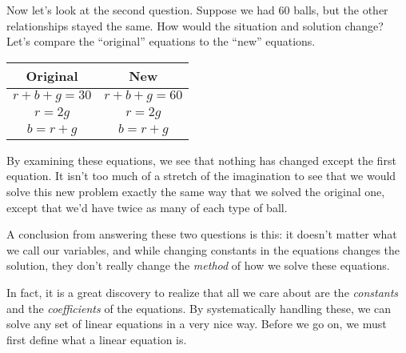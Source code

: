 Now let's look at the second question. Suppose we had 60 balls, but the other relationships stayed the same. How would the situation and solution change? Let's compare the ``original'' equations to the ``new'' equations.
\begin{center}\begin{tabular}{c|c} Original & New \\ \hline $r+b+g=30$ & $r+b+g=60$ \\ $r=2g$ & $r=2g$ \\ $b=r+g$ & $b=r+g$ \\ \end{tabular}\end{center}

By examining these equations, we see that nothing has changed except the first equation. It isn't too much of a stretch of the imagination to see that we would solve this new problem exactly the same way that we solved the original one, except that we'd have twice as many of each type of ball.



A conclusion from answering these two questions is this: it doesn't matter what we call our variables, and while changing constants in the equations changes the solution, they don't really change the {\em method} of how we solve these equations.

In fact, it is a great discovery to realize that all we care about are the {\em constants} and the {\em coefficients} of the equations. By systematically handling these, we can solve any set of linear equations in a very nice way. Before we go on, we must first define what a  linear equation is. 

\smallskip


